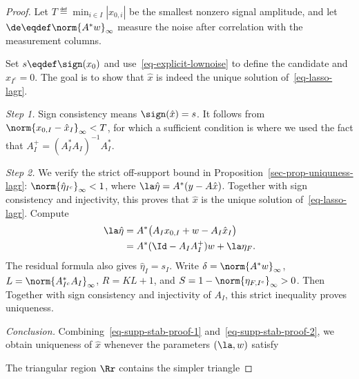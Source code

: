 \begin{proof}
    Let $T \eqdef \min_{i \in I} |x_{0,i}|$ be the smallest nonzero signal amplitude, and let $\de \eqdef \norm{A^* w}_\infty$
    measure the noise after correlation with the measurement columns.
	 
    Set $s \eqdef \sign(x_0)$ and use~\eqref{eq-explicit-lownoise} to define the candidate
	and $\hat x_{I^c}=0$. The goal is to show that $\hat x$ is indeed the unique solution of~\eqref{eq-lasso-lagr}. 
	
	
    \noindent\textit{Step 1.} Sign consistency means $\sign(\hat x)=s$. It follows from $\norm{x_{0,I}-\hat x_I}_\infty < T$, for which a sufficient condition is
	where we used the fact that $A_I^+ = (A_I^*A_I)^{-1} A_I^*$.
	
    \noindent\textit{Step 2.} We verify the strict off-support bound in Proposition~\ref{sec-prop-uniquness-lagr}: $\norm{\hat \eta_{I^c}}_\infty < 1$, where $\la \hat \eta = A^* (y-A \hat x)$. Together with sign consistency and injectivity, this proves that $\hat x$ is the unique solution of~\eqref{eq-lasso-lagr}. Compute
	\begin{align*}
		\la \hat \eta &= A^*\big(A_Ix_{0,I}+w-A_I\hat x_I\big) \\
			&=  A^* ( \Id - A_I A_I^+ ) w + \la \eta_F.
	\end{align*}
The residual formula also gives $\hat\eta_I=s_I$. Write $\delta=\norm{A^*w}_\infty$, $L=\norm{A_{I^c}^*A_I}_\infty$, $R=KL+1$, and $S=1-\norm{\eta_{F,I^c}}_\infty>0$. Then
Together with sign consistency and injectivity of $A_I$, this strict inequality proves uniqueness.

    \noindent\textit{Conclusion.} Combining~\eqref{eq-supp-stab-proof-1} and~\eqref{eq-supp-stab-proof-2}, we obtain uniqueness of $\hat x$ whenever the parameters $(\la,w)$ satisfy
	
	
    The triangular region $\Rr$ contains the simpler triangle
	                                                                                 
\end{proof}

